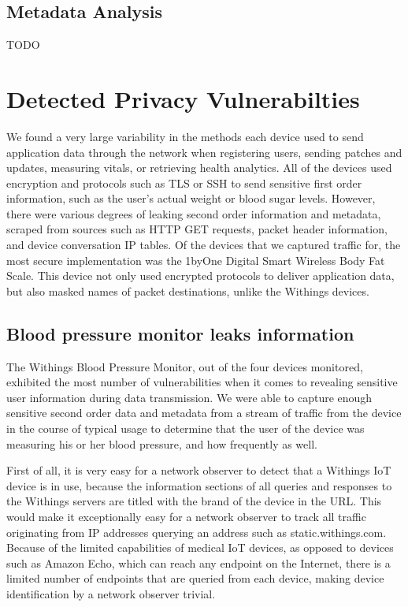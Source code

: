 \subsection{Metadata Analysis}
TODO

\section{Detected Privacy Vulnerabilties}

We found a very large variability in the methods each device used to send application data through the network when registering users, sending patches and updates, measuring vitals, or retrieving health analytics. All of the devices used encryption and protocols such as TLS or SSH to send sensitive first order information, such as the user's actual weight or blood sugar levels. However, there were various degrees of leaking second order information and metadata, scraped from sources such as HTTP GET requests, packet header information, and device conversation IP tables. Of the devices that we captured traffic for, the most secure implementation was the 1byOne Digital Smart Wireless Body Fat Scale. This device not only used encrypted protocols to deliver application data, but also masked names of packet destinations, unlike the Withings devices. 

\subsection{Blood pressure monitor leaks information}
The Withings Blood Pressure Monitor, out of the four devices monitored, exhibited the most number of vulnerabilities when it comes to revealing sensitive user information during data transmission. We were able to capture enough sensitive second order data and metadata from a stream of traffic from the device in the course of typical usage to determine that the user of the device was measuring his or her blood pressure, and how frequently as well. 

First of all, it is very easy for a network observer to detect that a Withings IoT device is in use, because the information sections of all queries and responses to the Withings servers are titled with the brand of the device in the URL. This would make it exceptionally easy for a network observer to track all traffic originating from IP addresses querying an address such as static.withings.com. Because of the limited capabilities of medical IoT devices, as opposed to devices such as Amazon Echo, which can reach any endpoint on the Internet, there is a limited number of endpoints that are queried from each device, making device identification by a network observer trivial.


